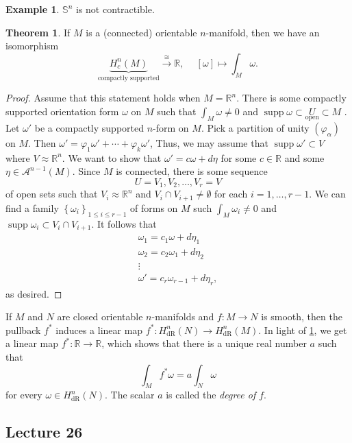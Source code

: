 \documentclass[10pt,letterpaper,cm]{nupset}
\theoremstyle{definition}
\newtheorem{exmp}[definition]{Example}
\theoremstyle{theorem}
\newtheorem{theorem}[definition]{Theorem}
\theoremstyle{remark}
\newcommand{\R}{\mathbb R}
\renewcommand{\S}{\mathbb S}
\newcommand{\1}{\mathbf{1}}
\newcommand{\0}{\vec 0}
\DeclareMathOperator{\supp}{supp}
\DeclareMathOperator{\dr}{dR}
\begin{document}
\begin{exmp}
$\S^n$ is not contractible.
\end{exmp}

\begin{theorem}\label{isom}
If $M$ is a (connected) orientable $n$-manifold, then we have an isomorphism $$\underbrace{H_c^n(M)}_{\text{compactly supported}} \overset{\cong}{\longrightarrow} \R,\ \quad \left[\omega\right] \mapsto \int_M \omega.$$
\end{theorem}
\begin{proof}
Assume that this statement holds when $M = \R^n$. There is some compactly supported orientation form $\omega$ on $M$ such that $\int_M \omega \ne 0$ and $\supp \omega \subset \underset{\text{open}}{U}\subset M$ . Let $\omega'$ be a compactly supported $n$-form on $M$. Pick a partition of unity $\left(\varphi_{\alpha}\right)$ on $M$. Then $\omega' =\varphi_1\omega' +\cdots + \varphi_k \omega'$, Thus, we may assume  that $\supp \omega' \subset V$ where $V \approx \R^n$. We want to show that $\omega' =c\omega + d\eta$ for some $c\in \R$ and some $\eta \in \mathcal{A}^{n-1}(M)$. Since $M$ is connected, there is some sequence $$U=V_1, V_2, \ldots, V_r=V$$ of open sets such that $V_i\approx \R^n$ and $V_i\cap V_{i+1} \ne \emptyset$ for each $i=1, \ldots, r-1$. We can find a family $\left\{\omega_i\right\}_{1\leq i \leq r-1}$ of forms on $M$ such $\int_M \omega_i \ne 0$ and $\supp \omega_i \subset V_i \cap V_{i+1}$.  It follows that 
\begin{gather*}
 \omega_1  = c_1\omega + d\eta_1
\\ \omega_2  = c_2\omega_1+ d\eta_2
\\  \vdots
\\  \omega'  =  c_r\omega_{r-1}+d\eta_r
, \end{gather*} as desired.
\end{proof}

If $M$ and $N$ are closed orientable $n$-manifolds and $f: M \to N$ is smooth, then the pullback $f^{\ast}$ induces a linear map $f^{\ast}: H_{\dr}^n(N) \to H_{\dr}^n(M)$. In light of \cref{isom}, we get a linear map $f^{\ast} : \R \to \R$, which shows that there is a unique  real number $a$ such that 
\[
\int_{M} f^{\ast} \omega = a\int_N \omega
\]
 for every $\omega \in H_{\dr}^n(N) $. The scalar $a$ is called the \textit{degree of $f$}. 

\subsection{Lecture 26}
\end{document}

